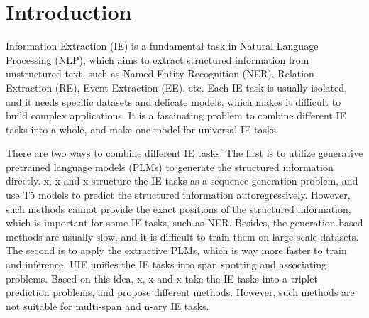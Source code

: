 \section{Introduction}

Information Extraction (IE) is a fundamental task in Natural Language Processing (NLP), which aims to extract structured information from unstructured text, such as Named Entity Recognition (NER), Relation Extraction (RE), Event Extraction (EE), etc.
Each IE task is usually isolated, and it needs specific datasets and delicate models, which makes it difficult to build complex applications.
It is a fascinating problem to combine different IE tasks into a whole, and make one model for universal IE tasks.

There are two ways to combine different IE tasks.
The first is to utilize generative pretrained language models (PLMs) to generate the structured information directly.
x, x and x structure the IE tasks as a sequence generation problem, and use T5 models to predict the structured information autoregressively.
However, such methods cannot provide the exact positions of the structured information, which is important for some IE tasks, such as NER.
Besides, the generation-based methods are usually slow, and it is difficult to train them on large-scale datasets.
The second is to apply the extractive PLMs, which is way more faster to train and inference.
UIE unifies the IE tasks into span spotting and associating problems.
Based on this idea, x, x and x take the IE tasks into a triplet prediction problems, and propose different methods.
However, such methods are not suitable for multi-span and n-ary IE tasks.

